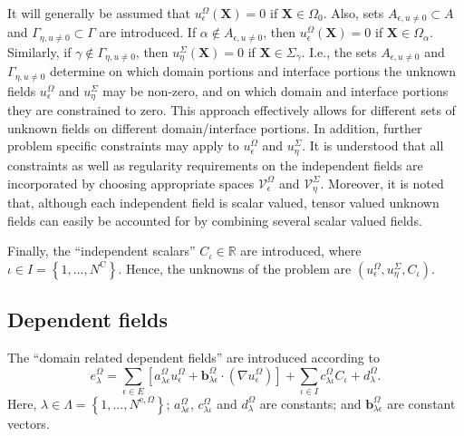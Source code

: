 \documentclass[pdftex,a4paper,12pt,abstracton]{scrartcl}
\begin{document}
It will generally be assumed that $u^\Omega_\epsilon(\boldsymbol{X}) = 0$ if $\boldsymbol{X} \in \Omega_0$. Also, sets $A_{\epsilon,u\neq 0} \subset A$ and $\Gamma_{\eta,u\neq 0} \subset \Gamma$ are introduced. If $\alpha \notin A_{\epsilon,u\neq 0}$, then $u^\Omega_\epsilon(\boldsymbol{X})=0$ if $\boldsymbol{X} \in \Omega_\alpha$. Similarly, if
$\gamma \notin \Gamma_{\eta,u\neq 0}$, then $u^\Sigma_\eta(\boldsymbol{X})=0$ if $\boldsymbol{X} \in \Sigma_\gamma$. I.e., the sets $A_{\epsilon,u\neq 0}$ and $\Gamma_{\eta,u\neq 0}$ determine on which domain portions and interface portions the unknown fields $u^\Omega_\epsilon$ and $u^\Sigma_\eta$ may be non-zero, and on which domain and interface portions they are constrained to zero. This approach effectively allows for different sets of unknown fields on different domain/interface portions. In addition, further problem specific constraints may apply to $u^\Omega_\epsilon$ and $u^\Sigma_\eta$. It is understood that all constraints as well as regularity requirements on the independent fields are incorporated by choosing appropriate spaces $\mathcal{V}^\Omega_\epsilon$ and $\mathcal{V}^\Sigma_\eta$. Moreover, it is noted that, although each independent field is scalar valued, tensor valued unknown fields can easily be accounted for by combining several scalar valued fields.

Finally, the ``independent scalars'' $C_\iota \in \mathbb{R}$ are introduced, where $\iota \in I=\left\{1, \hdots, N^\mathrm{C}\right\}$. Hence, the unknowns of the problem are $(u^\Omega_\epsilon, u^\Sigma_\eta, C_\iota)$.

\subsection{Dependent fields}
The ``domain related dependent fields'' are introduced according to
\begin{equation}
e^\Omega_\lambda = \sum_{\epsilon \in E} \left[ a^\Omega_{\lambda\epsilon} u^\Omega_\epsilon + \boldsymbol{b}^\Omega_{\lambda \epsilon} \cdot (\nabla u^\Omega_\epsilon) \right] + \sum_{\iota \in I}c^\Omega_{\lambda\iota} C_\iota  + d^\Omega_\lambda.
\label{dependent_field_domain}
\end{equation}
Here, $\lambda \in \Lambda=\left\{1, \hdots, N^{\mathrm{e},\Omega}\right\}$; $a^\Omega_{\lambda\epsilon}$, $c^\Omega_{\lambda\iota}$ and $d^\Omega_\lambda$ are constants; and $\boldsymbol{b}^\Omega_{\lambda\epsilon}$ are constant vectors.
\end{document}

